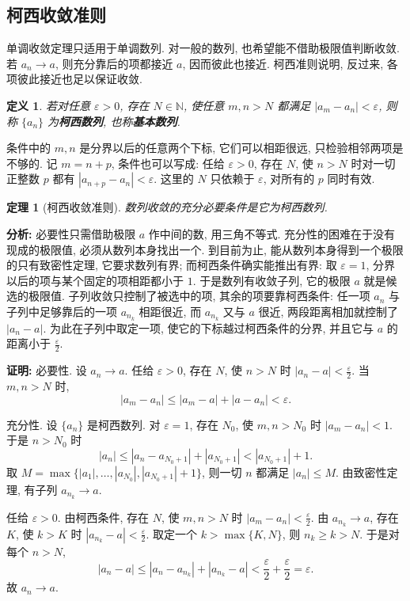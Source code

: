 \documentclass[UTF8,openany]{ctexbook}
\theoremstyle{chinesetextbook}
\newtheorem{definition}{定义}[section]
\newtheorem{theorem}{定理}[section]
\newenvironment{cnproof}{\par\indent\textbf{证明:} \ignorespaces}{\par}
\begin{document}
\subsection{柯西收敛准则}
单调收敛定理只适用于单调数列. 对一般的数列, 也希望能不借助极限值判断收敛. 若 $a_n\to a$, 则充分靠后的项都接近 $a$, 因而彼此也接近. 柯西准则说明, 反过来, 各项彼此接近也足以保证收敛.
\begin{definition}
若对任意 $\varepsilon>0$, 存在 $N\in\mathbb N$, 使任意 $m,n>N$ 都满足 $|a_m-a_n|<\varepsilon$, 则称 $\{a_n\}$ 为\textbf{柯西数列}, 也称\textbf{基本数列}.
\end{definition}
条件中的 $m,n$ 是分界以后的任意两个下标, 它们可以相距很远, 只检验相邻两项是不够的. 记 $m=n+p$, 条件也可以写成: 任给 $\varepsilon>0$, 存在 $N$, 使 $n>N$ 时对一切正整数 $p$ 都有 $|a_{n+p}-a_n|<\varepsilon$. 这里的 $N$ 只依赖于 $\varepsilon$, 对所有的 $p$ 同时有效.
\begin{theorem}[柯西收敛准则]
数列收敛的充分必要条件是它为柯西数列.
\end{theorem}
\par\indent\textbf{分析:} 必要性只需借助极限 $a$ 作中间的数, 用三角不等式. 充分性的困难在于没有现成的极限值, 必须从数列本身找出一个. 到目前为止, 能从数列本身得到一个极限的只有致密性定理, 它要求数列有界; 而柯西条件确实能推出有界: 取 $\varepsilon=1$, 分界以后的项与某个固定的项相距都小于 $1$. 于是数列有收敛子列, 它的极限 $a$ 就是候选的极限值. 子列收敛只控制了被选中的项, 其余的项要靠柯西条件: 任一项 $a_n$ 与子列中足够靠后的一项 $a_{n_k}$ 相距很近, 而 $a_{n_k}$ 又与 $a$ 很近, 两段距离相加就控制了 $|a_n-a|$. 为此在子列中取定一项, 使它的下标越过柯西条件的分界, 并且它与 $a$ 的距离小于 $\displaystyle\frac\varepsilon2$.
\begin{cnproof}
必要性. 设 $a_n\to a$. 任给 $\varepsilon>0$, 存在 $N$, 使 $n>N$ 时 $\displaystyle|a_n-a|<\frac\varepsilon2$. 当 $m,n>N$ 时,
\[
|a_m-a_n|\le|a_m-a|+|a-a_n|<\varepsilon.
\]

充分性. 设 $\{a_n\}$ 是柯西数列. 对 $\varepsilon=1$, 存在 $N_0$, 使 $m,n>N_0$ 时 $|a_m-a_n|<1$. 于是 $n>N_0$ 时
\[
|a_n|\le|a_n-a_{N_0+1}|+|a_{N_0+1}|<|a_{N_0+1}|+1.
\]
取 $M=\max\{|a_1|,\ldots,|a_{N_0}|,|a_{N_0+1}|+1\}$, 则一切 $n$ 都满足 $|a_n|\le M$. 由致密性定理, 有子列 $a_{n_k}\to a$.

任给 $\varepsilon>0$. 由柯西条件, 存在 $N$, 使 $m,n>N$ 时 $\displaystyle|a_m-a_n|<\frac\varepsilon2$. 由 $a_{n_k}\to a$, 存在 $K$, 使 $k>K$ 时 $\displaystyle|a_{n_k}-a|<\frac\varepsilon2$. 取定一个 $k>\max\{K,N\}$, 则 $n_k\ge k>N$. 于是对每个 $n>N$,
\[
|a_n-a|\le|a_n-a_{n_k}|+|a_{n_k}-a|<\frac\varepsilon2+\frac\varepsilon2=\varepsilon.
\]
故 $a_n\to a$.
\end{cnproof}
\end{document}
